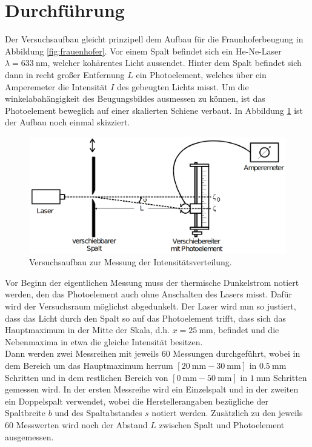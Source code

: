 \section{Durchführung}
\label{sec:Durchführung}
Der Versuchsaufbau gleicht prinzipell dem Aufbau für die Fraunhoferbeugung in Abbildung \ref{fig:frauenhofer}. Vor einem Spalt
befindet sich ein He-Ne-Laser $\lambda=\SI{633}{\nano\metre}$, welcher kohärentes Licht aussendet. Hinter dem Spalt befindet sich dann in
recht großer Entfernung $L$ ein Photoelement, welches über ein Amperemeter die Intensität $I$ des gebeugten Lichts misst. Um die
winkelabahängigkeit des Beugungsbildes ausmessen zu können, ist das Photoelement beweglich auf einer skalierten Schiene verbaut.
In Abbildung \ref{fig:aufbau} ist der Aufbau noch einmal skizziert.
\begin{figure}[H]
    \centering
    \includegraphics[scale = 0.35]{pictures/aufbau.png}
    \caption{Versuchsaufbau zur Messung der Intensitätsverteilung. \cite{AP01}}
    \label{fig:aufbau}
\end{figure}

\noindent
Vor Beginn der eigentlichen Messung muss der thermische Dunkelstrom notiert werden, den das Photoelement auch ohne Anschalten des Lasers
misst. Dafür wird der Versuchsraum möglichst abgedunkelt. Der Laser wird nun so justiert, dass das Licht durch den Spalt so auf das Photoelement trifft,
dass sich das Hauptmaximum in der Mitte der Skala, d.h. $x=\SI{25}{\milli\metre}$, befindet und die Nebenmaxima in etwa die gleiche Intensität besitzen.
\\\noindent
Dann werden zwei Messreihen
mit jeweils $\num{60}$ Messungen durchgeführt, wobei in dem Bereich um das Hauptmaximum herrum $[\SI{20}{\milli\metre}-\SI{30}{\milli\metre}]$
in $\SI{0.5}{\milli\metre}$ Schritten und in dem restlichen Bereich von $[\SI{0}{\milli\metre}-\SI{50}{\milli\metre}]$ in $\SI{1}{\milli\metre}$
Schritten gemessen wird. In der ersten Messreihe wird ein Einzelspalt und in der zweiten ein Doppelspalt verwendet, wobei die
Herstellerangaben bezügliche der Spaltbreite $b$ und des Spaltabstandes $s$ notiert werden. Zusätzlich zu den jeweils $\num{60}$ Messwerten
wird noch der Abstand $L$ zwischen Spalt und Photoelement ausgemessen.
